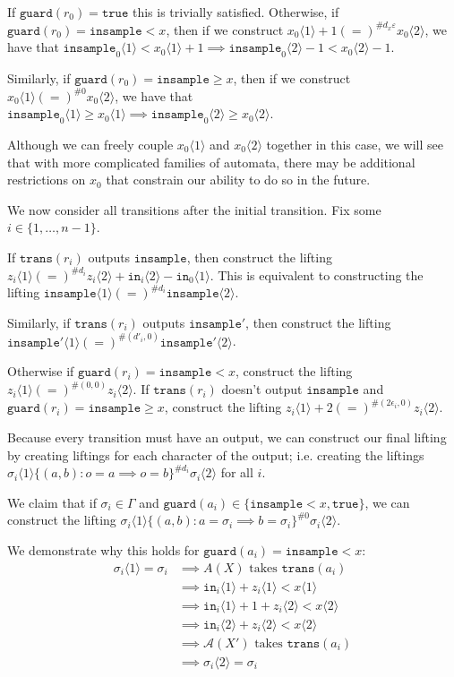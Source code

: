 \documentclass[12pt]{article}
\newcommand{\gguard}[1][x]{\texttt{insample}\geq #1}
\newcommand{\lguard}[1][x]{\texttt{insample} < #1}
\newcommand{\brangle}[1]{\langle #1 \rangle}
\newcommand{\guard}{\texttt{guard}}
\newcommand{\trans}{\texttt{trans}}
\theoremstyle{definition}
\begin{document}
If $\guard(r_0) = \texttt{true}$ this is trivially satisfied. Otherwise, if $\guard(r_0) = \lguard$, then if we construct $x_0\brangle{1}+1(=)^{\#d_x\varepsilon}x_0\brangle{2}$, we have that $\texttt{insample}_0\brangle{1} < x_0\brangle{1}+1\implies \texttt{insample}_0\brangle{2}-1<x_0\brangle{2}-1$. 

Similarly, if $\guard(r_0) = \gguard$, then if we construct $x_0\brangle{1}(=)^{\#0}x_0\brangle{2}$, we have that $\texttt{insample}_0\brangle{1} \geq x_0\brangle{1}\implies \texttt{insample}_0\brangle{2} \geq x_0\brangle{2}$.

Although we can freely couple $x_0\brangle{1}$ and $x_0\brangle{2}$ together in this case, we will see that with more complicated families of automata, there may be additional restrictions on $x_0$ that constrain our ability to do so in the future. 

We now consider all transitions after the initial transition. Fix some $i\in\{1, \ldots, n-1\}$. 

If $\trans(r_i)$ outputs $\texttt{insample}$, then construct the lifting $z_i\brangle{1} (=)^{\#d_i}z_i\brangle{2} + \texttt{in}_i\brangle{2}-\texttt{in}_0\brangle{1}$. This is equivalent to constructing the lifting $\texttt{insample}\brangle{1} (=)^{\#d_i}\texttt{insample}\brangle{2}$.

Similarly, if $\trans(r_i)$ outputs $\texttt{insample}'$, then construct the lifting \\$\texttt{insample}'\brangle{1} (=)^{\#(d'_i, 0)} \texttt{insample}'\brangle{2}$.


Otherwise if $\guard(r_i) = \lguard$, construct the lifting $z_i\brangle{1} (=)^{\#(0, 0)}z_i\brangle{2}$. If $\trans(r_i)$ doesn't output $\texttt{insample}$ and $\guard(r_i) = \gguard$, construct the lifting $z_i\brangle{1} + 2 (=)^{\#(2\epsilon_i, 0)}z_i\brangle{2}$. 

Because every transition must have an output, we can construct our final lifting by creating liftings for each character of the output; i.e. creating the liftings $\sigma_i\brangle{1}\{(a, b): o = a\implies o=b\}^{\#d_i}\sigma_i\brangle{2}$ for all $i$. 

We claim that if $\sigma_i \in \Gamma$ and $\guard(a_i) \in \{\lguard, \texttt{true}\}$, we can construct the lifting $\sigma_i\brangle{1}\{(a, b): a = \sigma_i \implies b = \sigma_i\}^{\#0}\sigma_i\brangle{2}$. 

We demonstrate why this holds for $\guard(a_i) = \lguard$: \begin{align*}\sigma_i\brangle{1} = \sigma_i&\implies A(X)\text{ takes }\trans(a_i)\\
&\implies \texttt{in}_i\langle 1 \rangle + z_i\langle 1 \rangle < x\langle 1 \rangle\\
&\implies\texttt{in}_i\langle 1 \rangle +1 + z_i\langle 2 \rangle < x\langle 2 \rangle\\
&\implies\texttt{in}_i\langle 2 \rangle + z_i\langle 2 \rangle < x\langle 2 \rangle\\
&\implies \mathcal{A}(X')\text{ takes }\trans(a_i)\\
&\implies \sigma_i\brangle{2} = \sigma_i
\end{align*}
\end{document}
